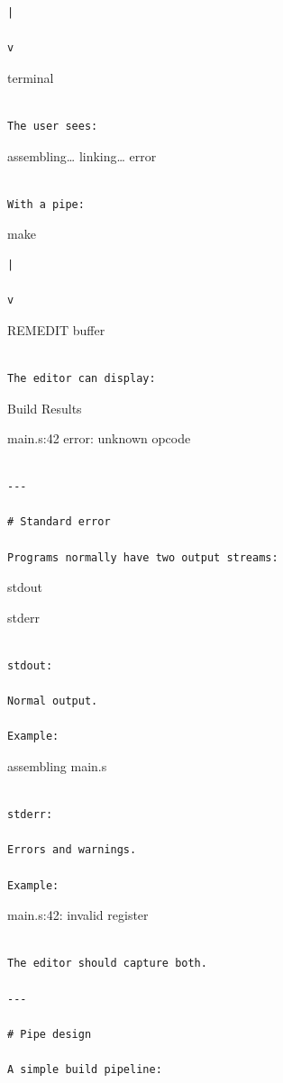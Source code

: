 \documentclass[
  oneside,
  openany]{book}
\begin{document}
\begin{verbatim}
|

v
\end{verbatim}

terminal

\begin{verbatim}

The user sees:
\end{verbatim}

assembling\ldots{} linking\ldots{} error

\begin{verbatim}

With a pipe:
\end{verbatim}

make

\begin{verbatim}
|

v
\end{verbatim}

REMEDIT buffer

\begin{verbatim}

The editor can display:
\end{verbatim}

Build Results

main.s:42 error: unknown opcode

\begin{verbatim}

---

# Standard error

Programs normally have two output streams:
\end{verbatim}

stdout

stderr

\begin{verbatim}

stdout:

Normal output.

Example:
\end{verbatim}

assembling main.s

\begin{verbatim}

stderr:

Errors and warnings.

Example:
\end{verbatim}

main.s:42: invalid register

\begin{verbatim}

The editor should capture both.

---

# Pipe design

A simple build pipeline:
\end{verbatim}
\end{document}
